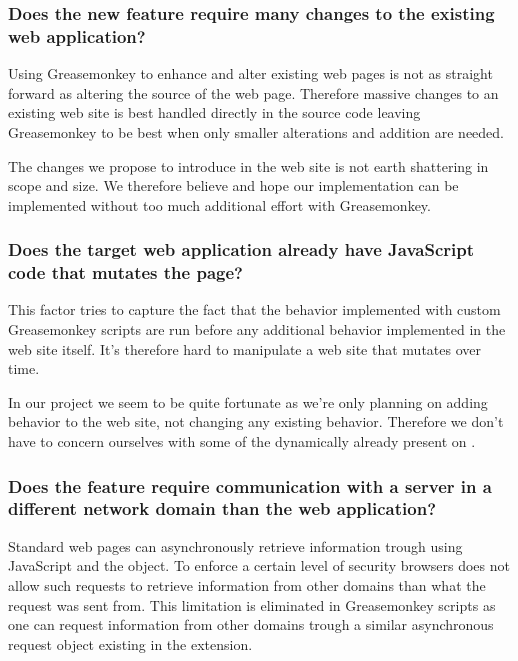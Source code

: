 \subsubsection{Does the new feature require many changes to the existing web
  application?}

Using Greasemonkey to enhance and alter existing web pages is not as straight
forward as altering the source of the web page. Therefore massive changes to
an existing web site is best handled directly in the source code leaving
Greasemonkey to be best when only smaller alterations and addition are needed.

The changes we propose to introduce in the \urort{} web site is not earth
shattering in scope and size. We therefore believe and hope our implementation
can be implemented without too much additional effort with Greasemonkey.

\subsubsection{Does the target web application already have JavaScript code
  that mutates the page?}

This factor tries to capture the fact that the behavior implemented with
custom Greasemonkey scripts are run before any additional behavior
implemented in the web site itself. It's therefore hard to manipulate
a web site that mutates over time.

In our project we seem to be quite fortunate as we're only planning on adding
behavior to the \urort{} web site, not changing any existing behavior.
Therefore we don't have to concern ourselves with some of the dynamically
already present on \urort{}.

\subsubsection{Does the feature require communication with a server in a
  different network domain than the web application?}

Standard web pages can asynchronously retrieve information trough using
JavaScript and the  object. To enforce a certain
level of security browsers does not allow such requests to retrieve
information from other domains than what the request was sent from.
This limitation is eliminated in Greasemonkey scripts as one can request
information from other domains trough a similar asynchronous request object
existing in the extension.

